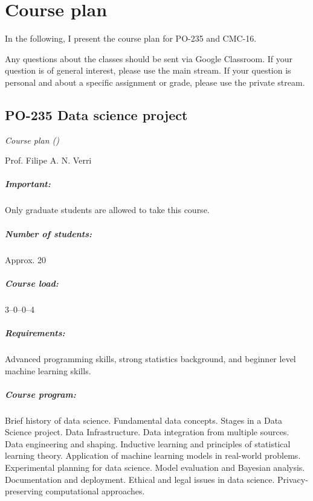 \chapter*{Course plan}

In the following, I present the course plan for PO-235 and CMC-16.

Any questions about the classes should be sent via Google Classroom.  If your question is
of general interest, please use the main stream.  If your question is personal and about
a specific assignment or grade, please use the private stream.

\newpage
\thispagestyle{empty}
\section*{PO-235 Data science project}

\emph{Course plan (\the\year{})}

Prof. Filipe A. N. Verri

\paragraph{Important:} Only graduate students are allowed to take this course.

\paragraph{Number of students:} Approx. 20

\paragraph{Course load:} 3--0--0--4

\paragraph{Requirements:} Advanced programming skills, strong statistics background, and
beginner level machine learning skills.

\paragraph{Course program:}
Brief history of data science.  Fundamental data concepts. Stages in a Data Science
project.  Data Infrastructure. Data integration from multiple sources. Data engineering
and shaping.  Inductive learning and principles of statistical learning theory.
Application of machine learning models in real-world problems.  Experimental planning for
data science. Model evaluation and Bayesian analysis.  Documentation and deployment.
Ethical and legal issues in data science.  Privacy-preserving computational approaches.

